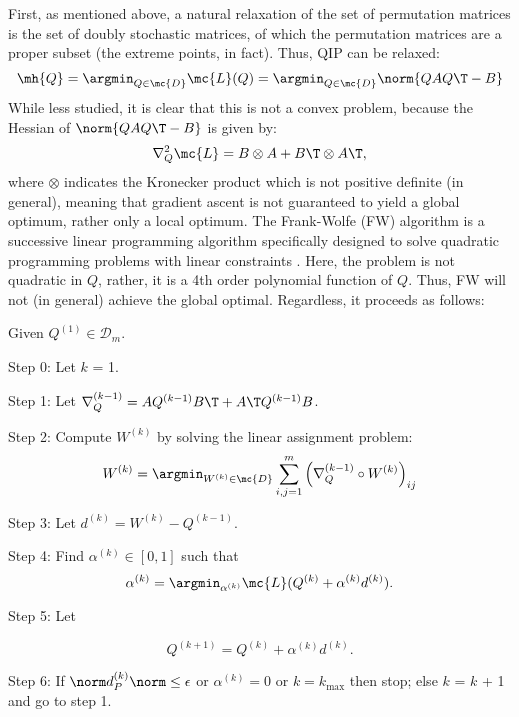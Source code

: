 First, as mentioned above, a natural relaxation of the set of permutation matrices is the set of doubly stochastic matrices, of which the permutation matrices are a proper subset (the extreme points, in fact).  Thus, QIP can be relaxed:
\begin{align} \label{eq:D}
	\mh{Q} = \argmin_{Q \in \mc{D}} \mc{L}(Q) = \argmin_{Q \in \mc{D}} \norm{Q A Q\T - B}
\end{align}
While less studied, it is clear that this is not a convex problem, because the Hessian of $\norm{QAQ\T -B}$ is given by:
\begin{align}
	\nabla_Q^2 \mc{L} =  B \otimes A + B\T \otimes A\T,
\end{align}
where $\otimes$ indicates the Kronecker product
which is not positive definite (in general), meaning that gradient ascent is not guaranteed to yield a global optimum, rather only a local optimum.  The Frank-Wolfe (FW) algorithm is a successive linear programming algorithm specifically designed to solve quadratic programming problems with linear constraints \cite{??}.  Here, the problem is not quadratic in $Q$, rather, it is a 4th order polynomial function of $Q$.  Thus, FW will not (in general) achieve the global optimal.  Regardless, it proceeds as follows:
\begin{Alg}
Given $ Q^{(1)} \in \mathcal D_m $.
\item {Step 0:} Let $k$ = 1.

\item {Step 1:} Let $\nabla_Q^{(k-1)} = A Q^{(k-1)} B\T + A\T Q^{(k-1)} B$.  

\item {Step 2:} Compute $W^{(k)}$  by solving the
linear assignment problem:
\begin{align}
	W^{(k)} = \argmin_{W^{(k)} \in \mc{D}} %
	\sum_{i,j=1}^m 
	\left( 
	\nabla_Q^{(k-1)}\circ W^{(k)}
	 \right)_{ij}
\end{align}
\item {Step 3:} Let $d^{(k)} = W^{(k)} - Q^{(k-1)}. $
\item {Step 4:} Find $\alpha^{(k)} \in [0,1]$ such that
$$\alpha^{(k)}=\argmin_{\alpha^{(k)}}
\mc{L} (Q^{(k)} + \alpha^{(k)} d^{(k)}).
$$
\item {Step 5:} Let

$$ Q^{(k+1)} = Q^{(k)} + \alpha^{(k)} d^{(k)}. $$
\item {Step 6:} 
If $\norm d^{(k)}_{P} \norm \le \epsilon$ or $\alpha^{(k)}=0$ or $k=k_{\max}$
then stop; else $k$ = $k$ + 1 and go to step 1.
\end{Alg}

